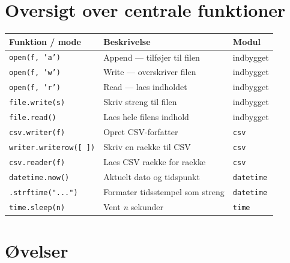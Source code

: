 \documentclass[12pt, a4paper]{article}
\begin{document}
\section{Oversigt over centrale funktioner}

\begin{center}
\begin{tabular}{lp{6cm}l}
\toprule
\textbf{Funktion / mode} & \textbf{Beskrivelse} & \textbf{Modul} \\
\midrule
\texttt{open(f, 'a')} & Append --- tilføjer til filen & indbygget \\
\texttt{open(f, 'w')} & Write --- overskriver filen & indbygget \\
\texttt{open(f, 'r')} & Read --- laes indholdet & indbygget \\
\texttt{file.write(s)} & Skriv streng til filen & indbygget \\
\texttt{file.read()} & Laes hele filens indhold & indbygget \\
\texttt{csv.writer(f)} & Opret CSV-forfatter & \texttt{csv} \\
\texttt{writer.writerow([ ])} & Skriv en raekke til CSV & \texttt{csv} \\
\texttt{csv.reader(f)} & Laes CSV raekke for raekke & \texttt{csv} \\
\texttt{datetime.now()} & Aktuelt dato og tidspunkt & \texttt{datetime} \\
\texttt{.strftime("...")} & Formater tidsstempel som streng & \texttt{datetime} \\
\texttt{time.sleep(n)} & Vent \textit{n} sekunder & \texttt{time} \\
\bottomrule
\end{tabular}
\end{center}

\section{Øvelser}
\end{document}
